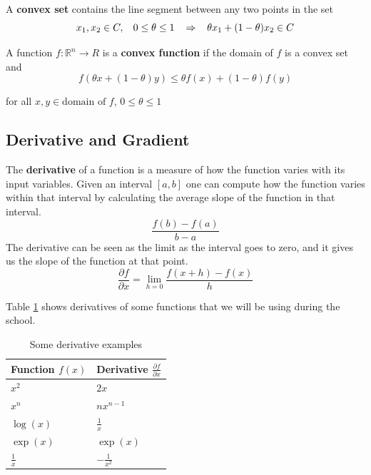 \vspace{0.1in}
\noindent A {\bf convex set} contains the line segment between any two points in the set 
\begin{equation*}
x_{1}, x_{2} \in C,\hspace{0.12in} 0 \leq \theta \leq 1 \hspace{0.12in} \Rightarrow \hspace{0.12in} \theta x_{1} + (1-\theta)x_{2} \in C
\end{equation*}

\vspace{0.1in}
\noindent A function $f: \mathbb{R}^{n}\rightarrow R$ is a {\bf convex function} if the domain of $f$ is a convex set and 
\begin{equation*}
f(\theta x + (1-\theta) y) \leq \theta f(x) + (1-\theta) f(y)
\end{equation*}

\noindent for all $x,y \in \text{domain of } f$, $0 \leq \theta \leq 1$

\subsection{Derivative and Gradient}

The \textbf{derivative} of a function is a measure of how the function varies with its input variables. Given an interval $[a,b]$ one can compute how the function varies within that interval by calculating the average slope of the function in that interval. 
\begin{equation}
\frac{f(b) - f(a)}{b-a} 
\end{equation}
The derivative can be seen as the limit as the interval goes to zero, and it gives us the slope of the function at that point.
\begin{equation}
\frac {\partial f}{\partial x} = \lim_{h = 0} \frac{f(x+h) - f(x)}{h} 
\end{equation}

\noindent Table \ref{tb::derivatives} shows derivatives of some functions that we will be using during the school.

\begin{table}[!h]
\begin{center}
\begin{tabular}{|l|l|}
\hline
Function $f(x)$& Derivative $\frac{\partial f}{\partial x}$\\
\hline
$x^2$ & $2x$\\
\hline
$x^n$ & $nx^{n-1}$\\
\hline
$\log(x)$ & $\frac{1}{x}$\\
\hline
$\exp(x)$ & $\exp(x)$\\
\hline
$\frac{1}{x}$ & $-\frac{1}{x^{2}}$\\
\hline
\end{tabular}
\end{center}
\caption{\label{tb::derivatives}Some derivative examples}
\end{table}

